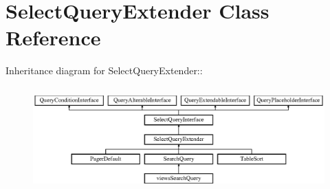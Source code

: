 \hypertarget{classSelectQueryExtender}{
\section{SelectQueryExtender Class Reference}
\label{classSelectQueryExtender}
}
Inheritance diagram for SelectQueryExtender::\begin{figure}[H]
\begin{center}
\leavevmode
\includegraphics[height=4.02299cm]{classSelectQueryExtender}
\end{center}
\end{figure}
